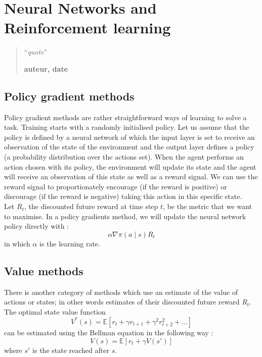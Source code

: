 \chapter{Neural Networks and Reinforcement learning}
\begin{quotation}
\noindent ``\emph{quote}''
\begin{flushright}\textbf{auteur, date}\end{flushright}
\end{quotation}

\vspace*{0.5cm}


\section{Policy gradient methods}
Policy gradient methods are rather straightforward ways of learning to solve a task.
Training starts with a randomly initialised policy. Let us assume that the
policy is defined by a neural network of which the input layer is set to 
receive an observation of the state of the environment and the output layer
defines a policy (a probability distribution over the actions set).
When the agent performs an action chosen with its policy, the environment will
update its state and the agent will receive an observation of this state as
well as a reward signal. We can use the reward signal to proportionately
encourage (if the reward is 
positive) or discourage (if the reward is negative) taking this action in 
this specific state. \\

Let $R_t$, the discounted future reward at time step $t$, be the metric
that we want to maximise. In a policy gradients method, we will update the
neural network policy directly with :
$$\alpha \nabla \pi(a \mid s) R_t$$
in which $\alpha$ is the learning rate.

\section{Value methods}
There is another category of methods which use an estimate of the value of
actions or states; in other words estimates of their discounted future reward
$R_t$.\\

The optimal state value function 
$$ V^*(s) = \mathbb{E}\left[ r_t + \gamma r_{t+1} + \gamma^2 r_{t+2}^2 + ...  \right]$$
can be estimated using the Bellman equation in the following way :
$$ V(s) = \mathbb{E}\left[ r_t + \gamma V(s')\right]$$
where $s'$ is the state reached after $s$.\\

